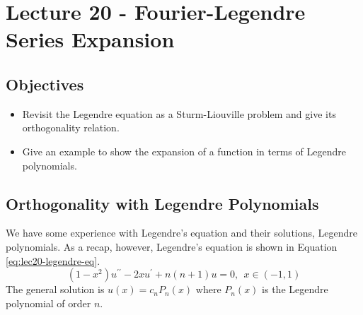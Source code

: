 \chapter{Lecture 20 - Fourier-Legendre Series Expansion}
\label{ch:lec20}
\section{Objectives}
\begin{itemize}
\item Revisit the Legendre equation as a Sturm-Liouville problem and give its orthogonality relation.
\item Give an example to show the expansion of a function in terms of Legendre polynomials.
\end{itemize}
\setcounter{lstannotation}{0} %
\section{Orthogonality with Legendre Polynomials}
We have some experience with Legendre's equation and their solutions, Legendre polynomials.  As a recap, however, Legendre's equation is shown in Equation \ref{eq:lec20-legendre-eq}.
\begin{equation}
\left(1-x^2\right)u^{\prime \prime} - 2xu^{\prime} + n(n+1)u = 0, \ \ x \in (-1,1)
\label{eq:lec20-legendre-eq}
\end{equation}
The general solution is $u(x) = c_nP_n(x)$ where $P_n(x)$ is the Legendre polynomial of order $n$.  

